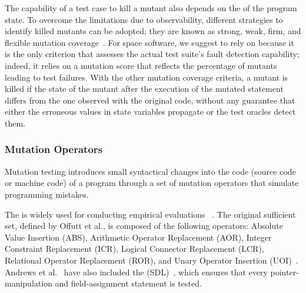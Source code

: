 The capability of a test case to kill a mutant also depends on the  of the program state. To overcome the limitations due to observability, different strategies to identify killed mutants can be adopted; they are known as strong, weak, firm, and flexible mutation coverage~\cite{ammann2016introduction}. For space software, we suggest to rely on  because it is the only criterion that assesses the actual test suite's fault detection capability; indeed, it relies on a mutation score that reflects the percentage of mutants leading to test failures. With the other mutation coverage criteria, a mutant is killed if the state of the mutant after the execution of the mutated statement differs from the one observed with the original code, without any guarantee that either the erroneous values in state variables propagate or the test oracles detect them.




\subsubsection{Mutation Operators}
\label{sec:related:operators}

%


Mutation testing introduces small syntactical changes into the code (source code or machine code) of a program through a set of mutation operators that simulate programming mistakes.



The   is widely used for conducting empirical evaluations ~\cite{offutt1996experimental,rothermel1996experimental,andrews2005mutation,kintis2017detecting}.
The original sufficient set, defined by Offutt et al., is composed of the following operators: Absolute Value Insertion (ABS), Arithmetic Operator Replacement (AOR), Integer Constraint Replacement (ICR), Logical Connector Replacement (LCR), Relational Operator Replacement (ROR), and Unary Operator Insertion (UOI)~\cite{offutt1996experimental}.
Andrews et al.~\cite{andrews2005mutation} have also included the
 (SDL)~\cite{delamaro2014designing}, which ensures that every pointer-manipulation and field-assignment statement is tested.

